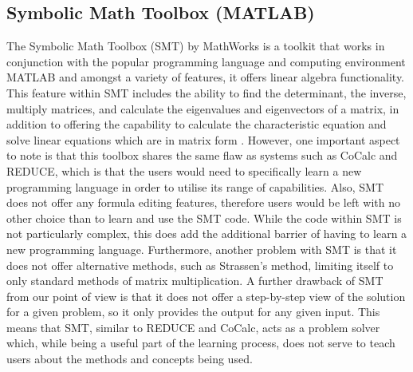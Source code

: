 \documentclass[
]{ceurart}
\begin{document}
\subsection{Symbolic Math Toolbox (MATLAB)}
The Symbolic Math Toolbox (SMT) by MathWorks \cite{smt} is a toolkit that works in conjunction with the popular programming language and computing environment MATLAB \cite{matlabweb} and amongst a variety of features, it offers linear algebra functionality. This feature within SMT includes the ability to find the determinant, the inverse, multiply matrices, and calculate the eigenvalues and eigenvectors of a matrix, in addition to offering the capability to calculate the characteristic equation and solve linear equations which are in matrix form \cite{matlab_linear}. However, one important aspect to note is that this toolbox shares the same flaw as systems such as CoCalc and REDUCE, which is that the users would need to specifically learn a new programming language in order to utilise its range of capabilities. Also, SMT does not offer any formula editing features, therefore users would be left with no other choice than to learn and use the SMT code. While the code within SMT is not particularly complex, this does add the additional barrier of having to learn a new programming language. Furthermore, another problem with SMT is that it does not offer alternative methods, such as Strassen's method, limiting itself to only standard methods of matrix multiplication. A further drawback of SMT from our point of view is that it does not offer a step-by-step view of the solution for a given problem, so it only provides the output for any given input. This means that SMT, similar to REDUCE and CoCalc, acts as a problem solver which, while being a useful part of the learning process, does not serve to teach users about the methods and concepts being used.
\end{document}
